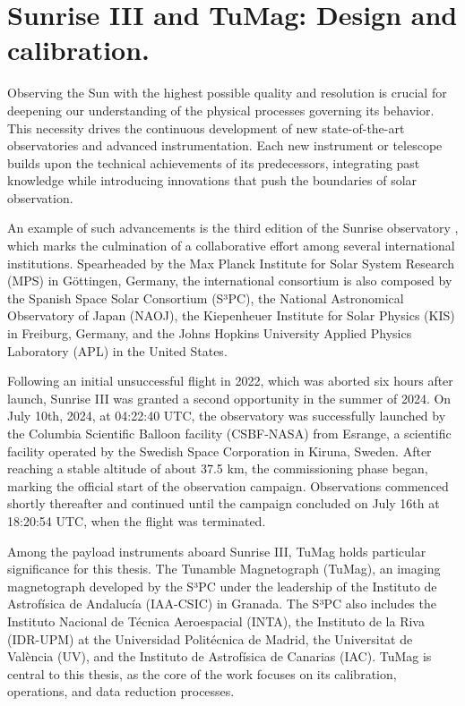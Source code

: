 \chapter{Sunrise III and TuMag: Design and calibration.}

Observing the Sun with the highest possible quality and resolution is crucial for deepening our understanding of the physical processes governing its behavior. This necessity drives the continuous development of new state-of-the-art observatories and advanced instrumentation. Each new instrument or telescope builds upon the technical achievements of its predecessors, integrating past knowledge while introducing innovations that push the boundaries of solar observation. 

An example of such advancements is the third edition of the Sunrise observatory \citep{SunriseIII}, which marks the culmination of a collaborative effort among several international institutions. Spearheaded by the Max Planck Institute for Solar System Research (MPS) in Göttingen, Germany, the international consortium is also composed by the Spanish Space Solar Consortium (S³PC), the National Astronomical Observatory of Japan (NAOJ), the Kiepenheuer Institute for Solar Physics (KIS) in Freiburg, Germany, and the Johns Hopkins University Applied Physics Laboratory (APL) in the United States. 

Following an initial unsuccessful flight in 2022, which was aborted six hours after launch, Sunrise III was granted a second opportunity in the summer of 2024. On July 10th, 2024, at 04:22:40 UTC, the observatory was successfully launched by the Columbia Scientific Balloon facility (CSBF-NASA) from Esrange, a scientific facility operated by the Swedish Space Corporation in Kiruna, Sweden. After reaching a stable altitude of about 37.5 km, the commissioning phase began, marking the official start of the observation campaign. Observations commenced shortly thereafter and continued until the campaign concluded on July 16th at 18:20:54 UTC, when the flight was terminated.

Among the payload instruments aboard Sunrise III, TuMag holds particular significance for this thesis. The Tunamble Magnetograph (TuMag), an imaging magnetograph developed by the S³PC under the leadership of the Instituto de Astrofísica de Andalucía (IAA-CSIC) in Granada. The S³PC also includes the Instituto Nacional de Técnica Aeroespacial (INTA), the Instituto de la Riva (IDR-UPM) at the Universidad Politécnica de Madrid, the Universitat de València (UV), and the Instituto de Astrofísica de Canarias (IAC). TuMag is central to this thesis, as the core of the work focuses on its calibration, operations, and data reduction processes.

